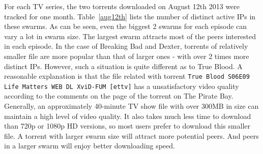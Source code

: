 \documentclass[conference]{IEEEtran}
\begin{document}
\begin{table}[!h]
\begin{footnotesize}
\renewcommand{\arraystretch}{1.0}
\caption{IP Participation at Swarm Level}
\label{aug12th}
\end{footnotesize}
\end{table}

For each TV series, the two torrents downloaded on August 12th 2013 were tracked for one month. Table~\ref{aug12th} lists the number of distinct active IPs in these swarms. As can be seen, even the biggest 2 swarms for each episode can vary a lot in swarm size. The largest swarm attracts most of the peers interested in each episode. In the case of Breaking Bad and Dexter, torrents of relatively smaller file are more popular than that of larger ones - with over 2 times more distinct IPs. However, such a situation is quite different as to True Blood. A reasonable explanation is that the file related with torrent \texttt{True Blood S06E09 Life Matters WEB DL XviD-FUM [ettv]} has a unsatisfactory video quality according to the comments on the page of the torrent on The Pirate Bay. Generally, an approximately 40-minute TV show file with over 300MB in size can maintain a high level of video quality. It also takes much less time to download than 720p or 1080p HD versions, so most users prefer to download this smaller file. A torrent with larger swarm size will attract more potential peers. And peers in a larger swarm will enjoy better downloading speed. 
\end{document}
